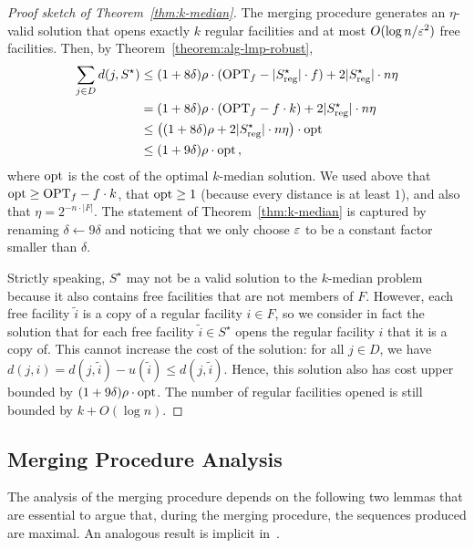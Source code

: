 \begin{proof}[Proof sketch of Theorem~\ref{thm:k-median}]
The merging procedure generates an $\eta$-valid solution that opens exactly $k$ regular facilities and at most $O(\log n/ \varepsilon^2)$ free facilities. 
Then, by Theorem~\ref{theorem:alg-lmp-robust},
\begin{align*}
\sum_{j \in D} d(j, S^\star)
&\leq (1+8\delta) \rho \cdot (\mathrm{OPT}_f - |S^\star_{\mathrm{reg}}| \cdot f) + 2 |S_{\mathrm{reg}}^\star| \cdot n \eta\\
&= (1+8\delta) \rho \cdot \left( \mathrm{OPT}_f - f \cdot k \right)  + 2 |S_{\mathrm{reg}}^\star| \cdot n \eta\\
&\leq \left((1+8\delta)\rho + 2 |S_{\mathrm{reg}}^\star| \cdot n \eta\right) \cdot \mathrm{opt}\\
&\leq (1+9\delta)\rho \cdot \mathrm{opt}\,,
\end{align*}
where $\mathrm{opt}$ is the cost of the optimal $k$-median solution.
We used above that $\mathrm{opt} \geq \mathrm{OPT}_f - f \cdot k$, that $\mathrm{opt} \geq 1$ (because every distance is at least $1$), and also that $\eta = 2^{-n \cdot |F|}$.
The statement of Theorem~\ref{thm:k-median} is captured by renaming $\delta \gets 9\delta$ and noticing that we only choose $\varepsilon$ to be a constant factor smaller than $\delta$.

Strictly speaking, $S^\star$ may not be a valid solution to the $k$-median problem because it also contains free facilities that are not members of $F$.
However, each free facility $\tilde{i}$ is a copy of a regular facility $i \in F$, so we consider in fact the solution that for each free facility $\tilde{i} \in S^\star$ opens the regular facility $i$ that it is a copy of.
This cannot increase the cost of the solution: for all $j \in D$, we have $d(j, i) = d(j, \tilde{i}) - u(\tilde{i}) \leq d(j, \tilde{i})$.
Hence, this solution also has cost upper bounded by $(1+9\delta)\rho \cdot \mathrm{opt}$.
The number of regular facilities opened is still bounded by $k + O(\log n)$.
\end{proof}

\subsection{Merging Procedure Analysis}

The analysis of the merging procedure depends on the following two lemmas that are essential to argue that, during the merging procedure, the sequences produced are maximal.
An analogous result is implicit in~\cite{MR4928455-Cohen25}.

